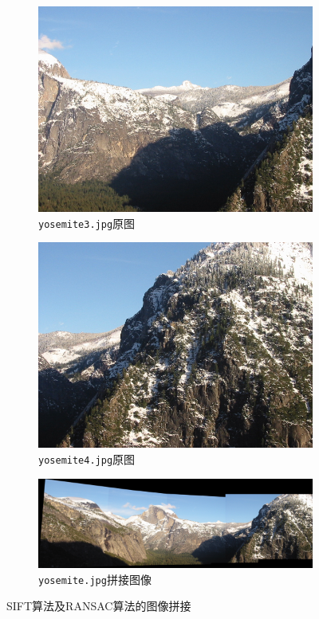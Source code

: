 \documentclass[a4paper, utf8]{ctexart}
\begin{document}
\begin{figure}[htbp]
		\begin{subfigure}{.45\textwidth}
			\centering
			\includegraphics[height=.13\textheight]{./figure/yosemite3.jpg}
			\caption{\texttt{yosemite3.jpg}原图}
		\end{subfigure}
		\begin{subfigure}{.45\textwidth}
			\centering
			\includegraphics[height=.13\textheight]{./figure/yosemite4.jpg}
			\caption{\texttt{yosemite4.jpg}原图}
		\end{subfigure}
		
		\begin{subfigure}{.8\textwidth}
			\centering
			\includegraphics[height=.13\textheight]{./figure/yosemite_opencv_stitching.png}
			\caption{\texttt{yosemite.jpg}拼接图像}
		\end{subfigure}
		\caption{SIFT算法及RANSAC算法的图像拼接}
	\end{figure}
	
\end{document}
